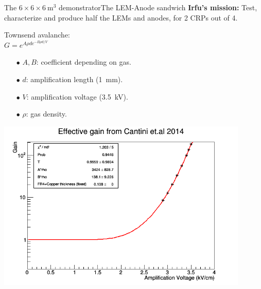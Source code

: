 \documentclass[10pt]{beamer}
\begin{document}
    \begin{frame}{The \texorpdfstring{$6 \times 6 \times \SI{6}{\meter\cubed}$}{666}
    		demonstrator}{The LEM-Anode sandwich}
    	\centering \textbf{Irfu's mission: }Test, characterize and produce  half the LEMs and anodes, for 2 CRPs out of 4.\\\vfill
   		\begin{minipage}{0.48\textwidth}
   			Townsend avalanche:\\
   			\centering  $G = e^{A\rho d e^{-B\rho d/V}}$\\
   			\begin{scriptsize}
    			\begin{itemize}
    				\item[$\bullet$] $A,B$: coefficient depending on gas.
    				\item[$\bullet$] $d$: amplification length (\SI{1}{\milli\meter}).
    				\item[$\bullet$] $V$: amplification voltage (\SI{3.5}{\kilo\volt}).
    				\item[$\bullet$] $\rho$: gas density.
    			\end{itemize}
    		\end{scriptsize} 
   			\vfill
			\includegraphics[width=0.9\textwidth]{figures/666/3L_gain.png}
   		\end{minipage}\hfill
   		\begin{minipage}{0.48\textwidth}

\end{minipage}
\end{frame}
\end{document}
